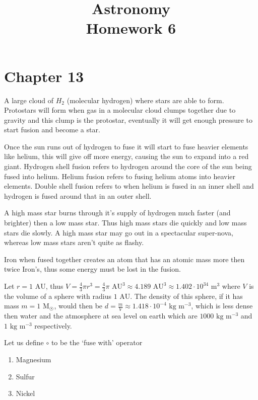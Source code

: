 \documentclass{article}
\title{Astronomy\\Homework 6}
\begin{document}
	\maketitle
	
	\section{Chapter 13}
	 A large cloud of $H_2$ (molecular hydrogen) where stars are able to form. Protostars will form when gas in a molecular cloud clumps together due to gravity and this clump is the protostar, eventually it will get enough pressure to start fusion and become a star.
	
	 Once the sun runs out of hydrogen to fuse it will start to fuse heavier elements like helium, this will give off more energy, causing the sun to expand into a red giant. Hydrogen shell fusion refers to hydrogen around the core of the sun being fused into helium. Helium fusion refers to fusing helium atoms into heavier elements. Double shell fusion refers to when helium is fused in an inner shell and hydrogen is fused around that in an outer shell.
	
	 A high mass star burns through it's supply of hydrogen much faster (and brighter) then a low mass star. Thus high mass stars die quickly and low mass stars die slowly. A high mass star may go out in a spectacular super-nova, whereas low mass stars aren't quite as flashy.
	
	 Iron when fused together creates an atom that has an atomic mass more then twice Iron's, thus some energy must be lost in the fusion.
	
	 Let $r = 1 \text{ AU}$, thus $V = \frac43\pi r^3 = \frac43\pi\text{ AU}^3 \approx 4.189 \text{ AU}^3 \approx 1.402\cdot10^{34}\text{ m}^3$ where $V$ is the volume of a sphere with radius $1 \text{ AU}$. The density of this sphere, if it has mass $m = 1\text{ M}_{\astrosun}$, would then be $d = \frac mV \approx 1.418\cdot 10^{-4} \text{ kg}\text{ m}^{-3}$, which is less dense then water and the atmosphere at sea level on earth which are $1000 \text{ kg}\text{ m}^{-3}$ and $1\text{ kg}\text{ m}^{-3}$ respectively. 
	
	 Let us define $\circ$ to be the `fuse with' operator
	\begin{enumerate}[label=\alph*)]
		\item Magnesium
		\item Sulfur
		\item Nickel
	\end{enumerate}
	
\end{document}
